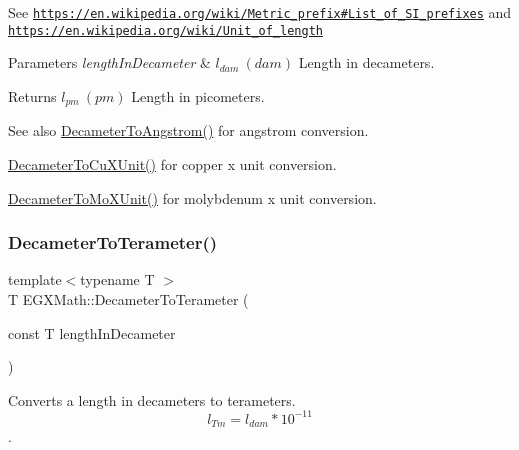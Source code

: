 See \href{https://en.wikipedia.org/wiki/Metric_prefix#List_of_SI_prefixes}{\tt https\+://en.\+wikipedia.\+org/wiki/\+Metric\+\_\+prefix\#\+List\+\_\+of\+\_\+\+S\+I\+\_\+prefixes} and \href{https://en.wikipedia.org/wiki/Unit_of_length}{\tt https\+://en.\+wikipedia.\+org/wiki/\+Unit\+\_\+of\+\_\+length} 
\begin{DoxyParams}{Parameters}
{\em length\+In\+Decameter} & $ l_{dam}\ (dam)$ Length in decameters. \\
\hline
\end{DoxyParams}
\begin{DoxyReturn}{Returns}
$ l_{pm}\ (pm)$ Length in picometers. 
\end{DoxyReturn}
\begin{DoxySeeAlso}{See also}
\mbox{\hyperlink{group___e_g_x_math-_conversions-_length_conversions-_decameter-_non-_s_i_ga2ea722ea1c773432c2680fe6ebd67638}{Decameter\+To\+Angstrom()}} for angstrom conversion. 

\mbox{\hyperlink{group___e_g_x_math-_conversions-_length_conversions-_decameter-_non-_s_i_gaf256500ca4f0b7a62018ea61078c29e3}{Decameter\+To\+Cu\+X\+Unit()}} for copper x unit conversion. 

\mbox{\hyperlink{group___e_g_x_math-_conversions-_length_conversions-_decameter-_non-_s_i_ga9e345feeb2568ded9fdceaf1d23d0ca6}{Decameter\+To\+Mo\+X\+Unit()}} for molybdenum x unit conversion. 
\end{DoxySeeAlso}
\mbox{\label{group___e_g_x_math-_conversions-_length_conversions-_decameter-_s_i_ga94859159b401c261bf562ab4e3071508}} 
\subsubsection{\texorpdfstring{Decameter\+To\+Terameter()}{DecameterToTerameter()}}
{\footnotesize\ttfamily template$<$typename T $>$ \\
T E\+G\+X\+Math\+::\+Decameter\+To\+Terameter (\begin{DoxyParamCaption}\item[{const T}]{length\+In\+Decameter }\end{DoxyParamCaption})}



Converts a length in decameters to terameters. \[ l_{Tm}=l_{dam} * 10^{-11} \]. 

